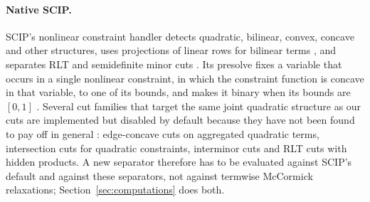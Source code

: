 \paragraph{Native SCIP.}
SCIP's nonlinear constraint handler detects quadratic, bilinear, convex,
concave and other structures, uses projections of linear rows for bilinear
terms \citep{MullerSerranoGleixner2020}, and separates RLT and semidefinite
minor cuts \citep{BestuzhevaEtAl2025}. Its presolve fixes a variable that
occurs in a single nonlinear constraint, in which the constraint function is
concave in that variable, to one of its bounds, and makes it binary when its
bounds are $[0,1]$ \citep[Section~4.2.7]{SCIP8report}. Several cut families
that target the same joint quadratic structure as our cuts are implemented
but disabled by default because they have not been found to pay off in
general \citep{BestuzhevaEtAl2025,SCIP10}: edge-concave cuts on aggregated
quadratic terms, intersection cuts for quadratic constraints, interminor cuts
and RLT cuts with hidden products. A new separator therefore has to be
evaluated against SCIP's default and against these separators, not against
termwise McCormick relaxations; Section~\ref{sec:computations} does both.
